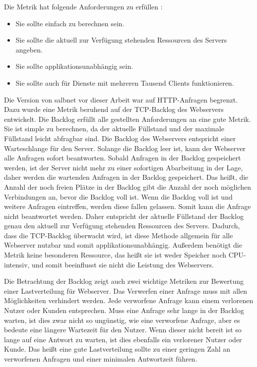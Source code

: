 \documentclass[a4paper, 12pt, BCOR10mm, DIV12, toc=bibliography, toc=listof, german]{scrbook}
\begin{document}
	Die Metrik hat folgende Anforderungen zu erfüllen \cite{scsczile2008}:

	\begin{itemize}
		\item Sie sollte einfach zu berechnen sein.
		\item Sie sollte die aktuell zur Verfügung stehenden Ressourcen des Servers angeben.
		\item Sie sollte applikationsunabhängig sein.
		\item Sie sollte auch für Dienste mit mehreren Tausend Clients funktionieren.
	\end{itemize}
	
	Die Version von salbnet vor dieser Arbeit war auf HTTP-Anfragen begrenzt. Dazu wurde eine Metrik
	beruhend auf der TCP-Backlog des Webservers entwickelt. Die Backlog erfüllt alle gestellten
	Anforderungen an eine gute Metrik. Sie ist simple zu berechnen, da der aktuelle Füllstand und der
	maximale Füllstand leicht abfragbar sind. Die Backlog des Webservers entspricht einer
	Warteschlange für den Server. Solange die Backlog leer ist, kann der Webserver alle Anfragen sofort
	beantworten.  Sobald Anfragen in der Backlog gespeichert werden, ist der Server nicht mehr zu
	einer sofortigen Abarbeitung in der Lage, daher werden die wartenden Anfragen in der Backlog
	gespeichert. Das heißt, die Anzahl der noch freien Plätze in der Backlog gibt die Anzahl der noch
	möglichen Verbindungen an, bevor die Backlog voll ist. Wenn die Backlog voll ist und weitere
	Anfragen eintreffen, werden diese fallen gelassen. Somit kann die Anfrage nicht beantwortet
	werden.  Daher entspricht der aktuelle Füllstand der Backlog genau den aktuell zur Verfügung
	stehenden Ressourcen des Servers. Dadurch, dass die TCP-Backlog überwacht wird, ist diese Methode
	allgemein für alle Webserver nutzbar und somit applikationsunabhängig. Außerdem benötigt die
	Metrik keine besonderen Ressource, das heißt sie ist weder Speicher noch CPU-intensiv, und somit
	beeinflusst sie nicht die Leistung des Webservers. 

	Die Betrachtung der Backlog zeigt auch zwei wichtige Metriken zur Bewertung einer Lastverteilung
	für Webserver. Das Verwerfen einer Anfrage muss mit allen Möglichkeiten verhindert werden. Jede
	verworfene Anfrage kann einem verlorenen Nutzer oder Kunden entsprechen. Muss eine Anfrage sehr
	lange in der Backlog warten, ist dies zwar nicht so ungünstig, wie eine verworfene Anfrage, aber
	es bedeute eine längere Wartezeit für den Nutzer. Wenn dieser nicht bereit ist so lange auf eine
	Antwort zu warten, ist dies ebenfalls ein verlorener Nutzer oder Kunde. Das heißt eine gute
	Lastverteilung sollte zu einer geringen Zahl an verworfenen Anfragen und einer minimalen
	Antwortzeit führen.
\end{document}
